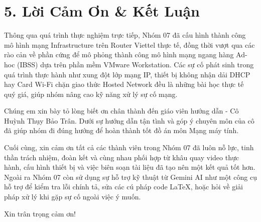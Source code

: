 \section{5. Lời Cảm Ơn \& Kết Luận}
\hspace*{0.65cm}Thông qua quá trình thực nghiệm trực tiếp, Nhóm 07 đã cấu hình thành công mô hình mạng Infrastructure trên Router Viettel thực tế, đồng thời vượt qua các rào cản về phần cứng để mô phỏng thành công mô hình mạng ngang hàng Ad-hoc (IBSS) dựa trên phần mềm VMware Workstation. Các sự cố phát sinh trong quá trình thực hành như xung đột lớp mạng IP, thiết bị không nhận dải DHCP hay Card Wi-Fi chặn giao thức Hosted Network đều là những bài học thực tế quý giá, giúp nhóm nâng cao kỹ năng xử lý sự cố mạng.

\hspace*{0.65cm}Chúng em xin bày tỏ lòng biết ơn chân thành đến giáo viên hướng dẫn - Cô Huỳnh Thụy Bảo Trân.
Dưới sự hướng dẫn tận tình và góp ý chuyên môn của cô đã giúp nhóm đi đúng hướng 
để hoàn thành tốt đồ án môn Mạng máy tính.

\hspace*{0.65cm}Cuối cùng, xin cảm ơn tất cả các thành viên trong Nhóm 07 đã luôn nỗ lực, tinh thần trách nhiệm,  
đoàn kết và cùng nhau phối hợp từ khâu quay video thực hành, cấu hình thiết bị và việc biên soạn tài liệu đã tạo nên một kết quả tốt hơn. Ngoài ra Nhóm 07 còn sử dụng sự hỗ trợ kỹ thuật từ Gemini AI như một công cụ hỗ trợ để kiểm tra lỗi chính tả, sửa các cú pháp code LaTeX, hoặc hỏi về giải pháp xử lý khi gặp sự cố ngoài việc ý muốn.

\hspace*{0.65cm}Xin trân trọng cảm ơn!